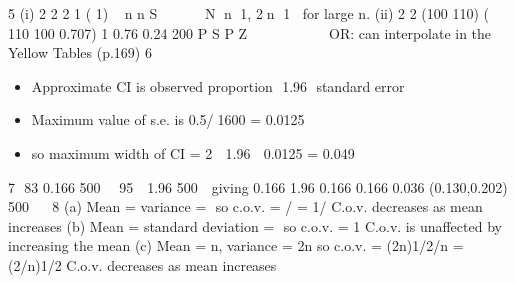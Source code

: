 \documentclass[a4paper,12pt]{article}
\begin{document}
5 (i)
2
2
2 1
( 1) ~ n
n S




 N n 1, 2n 1 for large n.
(ii)
2
2
(100 110) ( 110 100 0.707) 1 0.76 0.24
200
P S P Z 
      

OR: can interpolate in the Yellow Tables (p.169)
6 
\begin{itemize}
    \item Approximate CI is observed proportion  {1.96  standard error}
\item Maximum value of s.e. is 0.5/1600 = 0.0125
\item so maximum width of CI = 2  1.96  0.0125 = 0.049
\end{itemize}
7  83 0.166
500
  
95%
  1.96
500


giving 0.166 1.96 0.166 0.166 0.036 (0.130,0.202)
500
   
8 (a) Mean = variance =  so c.o.v. = / = 1/
C.o.v. decreases as mean increases
(b) Mean = standard deviation =  so c.o.v. = 1
C.o.v. is unaffected by increasing the mean
(c) Mean = n, variance = 2n so c.o.v. = (2n)1/2/n = (2/n)1/2
C.o.v. decreases as mean increases
\end{document}
